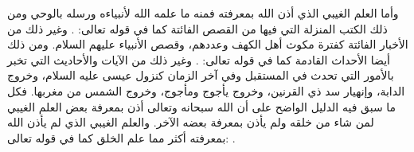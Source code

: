 وأما العلم الغيبي الذي أذن الله بمعرفته فمنه ما علمه الله لأنبياءه ورسله بالوحي ومن ذلك الكتب المنزلة التي فيها من القصص الفائتة كما في قوله تعالى:
\quranayah*[11][49]{\footnotesize \surahname*[11]}. وغير ذلك من الأخبار الفائتة كفترة مكوث أهل الكهف وعددهم، وقصص الأنبياء عليهم السلام. ومن ذلك أيضا الأحداث القادمة كما في قوله تعالى:
\quranayah*[34][3]{\footnotesize \surahname*[34]}. وغير ذلك من الآيات والأحاديث التي تخبر بالأمور التي تحدث في المستقبل وفي آخر الزمان كنزول عيسى عليه السلام، وخروج الدابة، وإنهيار سد ذي القرنين، وخروج يأجوج ومأجوج، وخروج الشمس من مغربها. فكل ما سبق فيه الدليل الواضح على أن الله سبحانه وتعالى أذن بمعرفة بعض العلم الغيبي لمن شاء من خلقه ولم يأذن بمعرفة بعضه الآخر. والعلم الغيبي الذي لم يأذن الله بمعرفته أكثر مما علم الخلق كما في قوله تعالى: 
\quranayah*[17][85][9]{\footnotesize \surahname*[17]}. 

